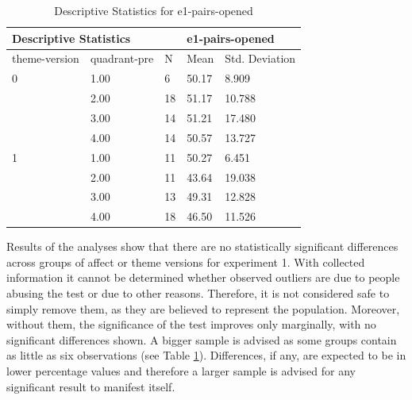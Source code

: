 		\begin{table}[]
			\centering
			\begin{tabular}{ll|l|ll}
				\hline
				\multicolumn{2}{l}{Descriptive Statistics}   &    & \multicolumn{2}{l}{e1-pairs-opened} \\ \hline
				theme-version          & quadrant-pre & N  & Mean          & Std. Deviation        \\ \hline
				0                      & 1.00         & 6  & 50.17         & 8.909                 \\
				& 2.00         & 18 & 51.17         & 10.788                \\ 
				& 3.00         & 14 & 51.21         & 17.480                \\ 
				& 4.00         & 14 & 50.57         & 13.727                \\ \hline
				1                      & 1.00         & 11 & 50.27         & 6.451                 \\
				& 2.00         & 11 & 43.64         & 19.038                \\ 
				& 3.00         & 13 & 49.31         & 12.828                \\ 
				& 4.00         & 18 & 46.50         & 11.526                \\ \hline
			\end{tabular}
			\caption{Descriptive Statistics for e1-pairs-opened}
			\label{tbl:group-sized-quadrant-theme-version}
		\end{table}
		
		Results of the analyses show that there are no statistically significant differences across groups of affect or theme versions for experiment 1. With collected information it cannot be determined whether observed outliers are due to people abusing the test or due to other reasons. Therefore, it is not considered safe to simply remove them, as they are believed to represent the population. Moreover, without them, the significance of the test improves only marginally, with no significant differences shown. A bigger sample is advised as some groups contain as little as six observations (see Table \ref{tbl:group-sized-quadrant-theme-version}). Differences, if any, are expected to be in lower percentage values and therefore a larger sample is advised for any significant result to manifest itself.
		

